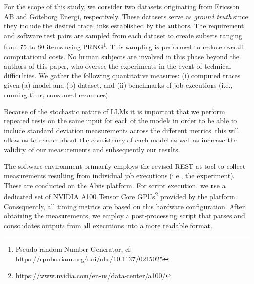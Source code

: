 \documentclass[conference]{IEEEtran}
\begin{document}
%
%
%
%
% 

For the scope of this study, we consider two datasets originating from Ericsson
AB and G\"oteborg Energi, respectively. These datasets serve as \textit{ground
truth} since they include the desired trace links established by the authors.
The requirement and software test pairs are sampled from each dataset to create
subsets ranging from 75 to 80 items using PRNG\footnote{Pseudo-random Number
Generator, cf. \url{https://epubs.siam.org/doi/abs/10.1137/0215025}}. This
sampling is performed to reduce overall computational costs. No human subjects
are involved in this phase beyond the authors of this paper, who oversee the
experiments in the event of technical difficulties. We gather the following
quantitative measures: (i) computed traces given (a) model and (b) dataset, and
(ii) benchmarks of job executions (i.e., running time, consumed resources).

Because of the stochastic nature of LLMs it is important that we perform
repeated tests on the same input for each of the models in order to be able to
include standard deviation measurements across the different metrics, this will
allow us to reason about the consistency of each model as well as increase the
validity of our measurements and subsequently our results.

The software environment primarily employs the revised REST-at tool to collect
measurements resulting from individual job executions (i.e., the experiment).
These are conducted on the Alvis platform. For script execution, we use a
dedicated set of NVIDIA A100 Tensor Core
GPUs\footnote{\url{https://www.nvidia.com/en-us/data-center/a100/}} provided by the
platform. Consequently, all timing metrics are based on this hardware
configuration. After obtaining the measurements, we employ a post-processing
script that parses and consolidates outputs from all executions into a more
readable format.
\end{document}
